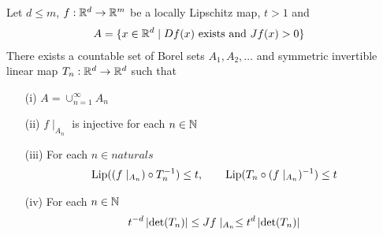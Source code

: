 \begin{lem}\label{AreaFormulaLipschitz:FunctionBounds}Let $d \leq m$, $f : \mathbb{R}^d \to \mathbb{R}^m$ be a locally Lipschitz map, $t>1$ and
\begin{align*}
A &= \lbrace x \in \mathbb{R}^d \mid Df(x) \text{ exists and } Jf(x) > 0\rbrace
\end{align*}
There exists a countable set of Borel sets $A_1, A_2, \dotsc$ and symmetric invertible linear map $T_n : \mathbb{R}^d \to \mathbb{R}^d$ such that 
\begin{itemize}
\item[(i)] $A = \cup_{n=1}^\infty A_n$
\item[(ii)] $f \mid_{A_n}$ is injective for each $n \in \mathbb{N}$
\item[(iii)] For each $n \in naturals$
\begin{align}\label{eq:AreaFormulaLipschitz:LipschitzConstants}
\operatorname*{Lip}((f \mid_{A_n}) \circ T_n^{-1}) \leq t, \qquad \operatorname*{Lip}(T_n \circ (f
  \mid_{A_n})^{-1}) \leq t
\end{align}
\item[(iv)] For each $n \in \mathbb{N}$
\begin{align}\label{eq:AreaFormulaLipschitz:JacobianBounds}
t^{-d} \left \vert \det(T_n) \right \vert \leq Jf\mid_{A_n} \leq t^{d} \left \vert \det(T_n) \right \vert 
\end{align}
\end{itemize}
\end{lem}
